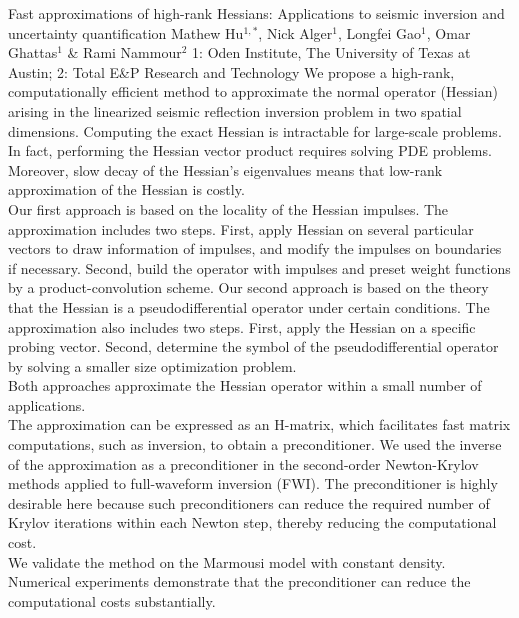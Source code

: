 \begin{addmargin}[2em]{0em}
\vspace{1.5ex}
\abs
{Fast approximations of high-rank Hessians: Applications to seismic inversion and uncertainty quantification}
{Mathew Hu$^{1,*}$, Nick Alger$^{1}$, Longfei Gao$^{1}$, Omar Ghattas$^{1}$ \& Rami Nammour$^{2}$}
{1: Oden Institute, The University of Texas at Austin; 2: Total E\&P Research and Technology}
{We propose a high-rank, computationally efficient method to approximate the normal operator (Hessian) arising in the linearized seismic reflection inversion problem in two spatial dimensions. Computing the exact Hessian is intractable for large-scale problems. In fact, performing the Hessian vector product requires solving PDE problems. Moreover, slow decay of the Hessian's eigenvalues means that low-rank approximation of the Hessian is costly.\\
Our first approach is based on the locality of the Hessian impulses. The approximation includes two steps. First, apply Hessian on several particular vectors to draw information of impulses, and modify the impulses on boundaries if necessary. Second, build the operator with impulses and preset weight functions by a product-convolution scheme. Our second approach is based on the theory that the Hessian is a pseudodifferential operator under certain conditions. The approximation also includes two steps. First, apply the Hessian on a specific probing vector. Second, determine the symbol of the pseudodifferential operator by solving a smaller size optimization problem.\\
Both approaches approximate the Hessian operator within a small number of applications.\\
The approximation can be expressed as an H-matrix, which facilitates fast matrix computations, such as inversion, to obtain a preconditioner. We used the inverse of the approximation as a preconditioner in the second-order Newton-Krylov methods applied to full-waveform inversion (FWI). The preconditioner is highly desirable here because such preconditioners can reduce the required number of Krylov iterations within each Newton step, thereby reducing the computational cost.\\
We validate the method on the Marmousi model with constant density. Numerical experiments demonstrate that the preconditioner can reduce the computational costs substantially.}




\end{addmargin}
